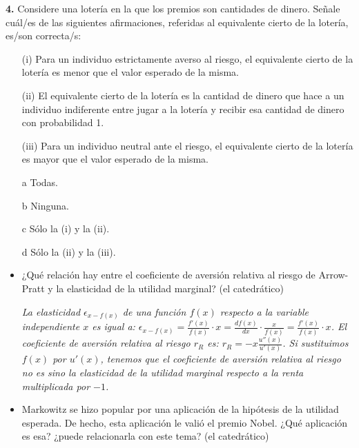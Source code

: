 \documentclass{nuevotema}
\begin{document}
\textbf{4.} Considere una lotería en la que los premios son cantidades de dinero. Señale cuál/es de las siguientes afirmaciones, referidas al equivalente cierto de la lotería, es/son correcta/s:

\begin{enumerate}
	\item[(i)] Para un individuo estrictamente averso al riesgo, el equivalente cierto de la lotería es menor que el valor esperado de la misma.
	\item[(ii)] El equivalente cierto de la lotería es la cantidad de dinero que hace a un individuo indiferente entre jugar a la lotería y recibir esa cantidad de dinero con probabilidad 1.
	\item[(iii)] Para un individuo neutral ante el riesgo, el equivalente cierto de la lotería es mayor que el valor esperado de la misma.
\end{enumerate}

\begin{enumerate}
	\item[a] Todas.
	\item[b] Ninguna.
	\item[c] Sólo la (i) y la (ii).
	\item[d] Sólo la (ii) y la (iii).
\end{enumerate}

\begin{itemize}
    \item ¿Qué relación hay entre el coeficiente de aversión relativa al riesgo de Arrow-Pratt y la elasticidad de la utilidad marginal? (el catedrático)
    
    \textit{La elasticidad $\epsilon_{x-f(x)}$ de una función $f(x)$ respecto a la variable independiente $x$ es igual a: $\epsilon_{x-f(x)} = \frac{f'(x)}{f(x)} \cdot x = \frac{df(x)}{dx} \cdot \frac{x}{f(x)} = \frac{f'(x)}{f(x)} \cdot x$. El coeficiente de aversión relativa al riesgo $r_R$ es: $r_R = -x \frac{u''(x)}{u'(x)}$. Si sustituimos $f(x)$ por $u'(x)$, tenemos que el coeficiente de aversión relativa al riesgo no es sino la elasticidad de la utilidad marginal respecto a la renta multiplicada por $-1$. }
    
    \item Markowitz se hizo popular por una aplicación de la hipótesis de la utilidad esperada. De hecho, esta aplicación le valió el premio Nobel. ¿Qué aplicación es esa? ¿puede relacionarla con este tema? (el catedrático)
\end{itemize}
\end{document}
